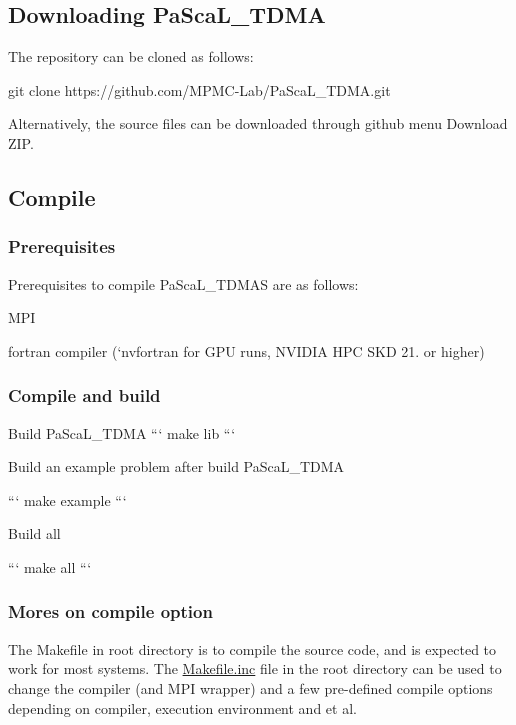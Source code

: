 \subsection*{Downloading Pa\+Sca\+L\+\_\+\+T\+D\+MA}

The repository can be cloned as follows\+:


\begin{DoxyCode}
git clone https://github.com/MPMC-Lab/PaScaL\_TDMA.git
\end{DoxyCode}
 Alternatively, the source files can be downloaded through github menu \textquotesingle{}Download Z\+IP\textquotesingle{}.

\subsection*{Compile}

\subsubsection*{Prerequisites}

Prerequisites to compile Pa\+Sca\+L\+\_\+\+T\+D\+M\+AS are as follows\+:
\begin{DoxyItemize}
\item M\+PI
\item fortran compiler (`nvfortran for G\+PU runs, N\+V\+I\+D\+IA H\+PC S\+KD 21. or higher)
\end{DoxyItemize}

\subsubsection*{Compile and build}


\begin{DoxyItemize}
\item Build Pa\+Sca\+L\+\_\+\+T\+D\+MA ``` make lib ```
\item Build an example problem after build Pa\+Sca\+L\+\_\+\+T\+D\+MA

``` make example ```
\item Build all

``` make all ``` \subsubsection*{Mores on compile option}

The {\ttfamily Makefile} in root directory is to compile the source code, and is expected to work for most systems. The \textquotesingle{}\hyperlink{_makefile_8inc}{Makefile.\+inc}\textquotesingle{} file in the root directory can be used to change the compiler (and M\+PI wrapper) and a few pre-\/defined compile options depending on compiler, execution environment and et al.
\end{DoxyItemize}


